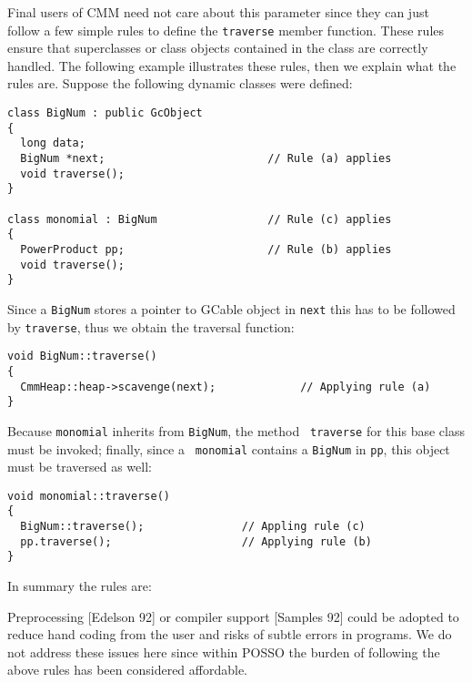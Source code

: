 Final users of CMM need not care about this
parameter since they can just follow a few simple rules to define the
{\tt traverse} member function.  These rules ensure that superclasses or
class objects contained in the class are correctly handled.  The
following example illustrates these rules, then we explain what the rules are.
Suppose the following dynamic classes were defined:
\begin{verbatim}
class BigNum : public GcObject
{
  long data;
  BigNum *next;                         // Rule (a) applies
  void traverse();
}

class monomial : BigNum                 // Rule (c) applies
{
  PowerProduct pp;                      // Rule (b) applies
  void traverse();
}
\end{verbatim}
Since a {\tt BigNum} stores a pointer to GCable object in
{\tt next} this has to be followed by {\tt traverse}, thus we obtain the
traversal function:

\begin{verbatim}
void BigNum::traverse()
{
  CmmHeap::heap->scavenge(next);             // Applying rule (a)
}
\end{verbatim}
Because {\tt monomial} inherits from {\tt BigNum}, the method {\tt
traverse} for this base class must be invoked; finally, since a {\tt
monomial} contains a {\tt BigNum} in {\tt pp}, this object must be
traversed as well:

\begin{verbatim}
void monomial::traverse()
{
  BigNum::traverse();               // Appling rule (c)
  pp.traverse();                    // Applying rule (b)
}
\end{verbatim}

In summary the rules are:


Preprocessing [Edelson 92] or compiler support [Samples 92] could be
adopted to reduce hand coding from the user and risks of subtle errors
in programs. We do not address these issues here since within POSSO
the burden of following the above rules has been considered affordable.


